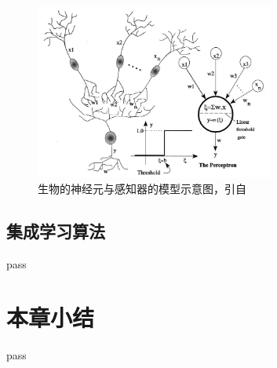 \begin{figure}[H]
  \centering
  \includegraphics[width=0.7\textwidth]{img/perceptron.png}
  \caption{生物的神经元与感知器的模型示意图，引自\cite{basheer2000artificial}}
  \label{fig:perceptron}
\end{figure}




\subsection{集成学习算法}
\label{ssec:intro_ensemble_learning}

pass






\section{本章小结}

pass
